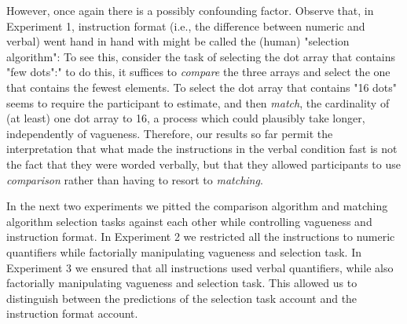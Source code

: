 However, once again there is a possibly confounding factor. Observe that, in Experiment 1, instruction format (i.e., the difference between numeric and verbal) went hand in hand with might be called the (human) "selection algorithm": To see this, consider the task of selecting the dot array that contains "few dots":" to do this, it suffices to \emph{compare} the three arrays and select the one that contains the fewest elements.  To select the dot array that contains "16 dots" seems to require the participant to estimate, and then \emph{match}, the cardinality of (at least) one dot array to 16, a process which could plausibly take longer, independently of vagueness. Therefore, our results so far permit the interpretation that what made the instructions in the verbal condition fast is not the fact that they were worded verbally, but that they allowed participants to use \emph{comparison} rather than having to resort to \emph{matching}.

In the next two experiments we pitted the comparison algorithm and matching algorithm selection tasks against each other while controlling vagueness and instruction format. In Experiment 2 we restricted all the instructions to numeric quantifiers while factorially manipulating vagueness and selection task. In Experiment 3 we ensured that all instructions used verbal quantifiers, while also factorially manipulating vagueness and selection task. This allowed us to distinguish between the predictions of the selection task account and the instruction format account. 
